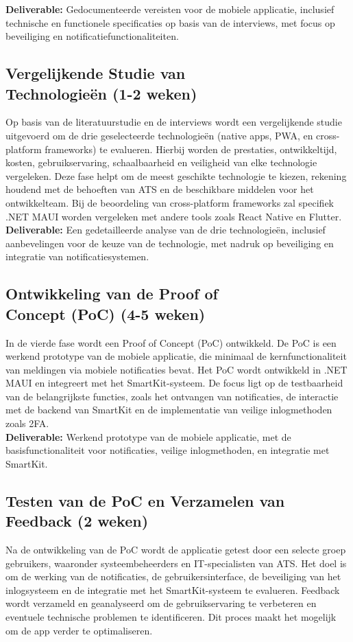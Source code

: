 \noindent \textbf{Deliverable:} Gedocumenteerde vereisten voor de mobiele applicatie, inclusief technische en functionele specificaties op basis van de interviews, met focus op beveiliging en notificatiefunctionaliteiten.

\subsection{Vergelijkende Studie van \\Technologieën (1-2 weken)}
\noindent Op basis van de literatuurstudie en de interviews wordt een vergelijkende studie uitgevoerd om de drie geselecteerde technologieën (native apps, PWA, en cross-platform frameworks) te evalueren. Hierbij worden de prestaties, ontwikkeltijd, kosten, gebruikservaring, schaalbaarheid en veiligheid van elke technologie vergeleken. Deze fase helpt om de meest geschikte technologie te kiezen, rekening houdend met de behoeften van ATS en de beschikbare middelen voor het ontwikkelteam. Bij de beoordeling van cross-platform frameworks zal specifiek .NET MAUI worden vergeleken met andere tools zoals React Native en Flutter. \\

\noindent \textbf{Deliverable:} Een gedetailleerde analyse van de drie technologieën, inclusief aanbevelingen voor de keuze van de technologie, met nadruk op beveiliging en integratie van notificatiesystemen.

\subsection{Ontwikkeling van de Proof of \\Concept (PoC) (4-5 weken)}
\noindent In de vierde fase wordt een Proof of Concept (PoC) ontwikkeld. De PoC is een werkend prototype van de mobiele applicatie, die minimaal de kernfunctionaliteit van meldingen via mobiele notificaties bevat. Het PoC wordt ontwikkeld in .NET MAUI en integreert met het SmartKit-systeem. De focus ligt op de testbaarheid van de belangrijkste functies, zoals het ontvangen van notificaties, de interactie met de backend van SmartKit en de implementatie van veilige inlogmethoden zoals 2FA. \\

\noindent \textbf{Deliverable:} Werkend prototype van de mobiele applicatie, met de basisfunctionaliteit voor notificaties, veilige inlogmethoden, en integratie met SmartKit.

\subsection{Testen van de PoC en Verzamelen van Feedback (2 weken)}
\noindent Na de ontwikkeling van de PoC wordt de applicatie getest door een selecte groep gebruikers, waaronder systeembeheerders en IT-specialisten van ATS. Het doel is om de werking van de notificaties, de gebruikersinterface, de beveiliging van het inlogsysteem en de integratie met het SmartKit-systeem te evalueren. Feedback wordt verzameld en geanalyseerd om de gebruikservaring te verbeteren en eventuele technische problemen te identificeren. Dit proces maakt het mogelijk om de app verder te optimaliseren. \\

